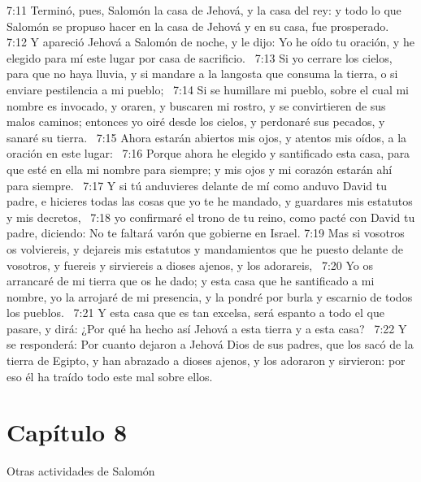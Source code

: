 							7:11 Terminó, pues, Salomón la casa de Jehová, y la casa del rey: y todo lo que Salomón se propuso hacer en la casa de Jehová y en su casa, fue prosperado.  
							7:12 Y apareció Jehová a Salomón de noche, y le dijo: Yo he oído tu oración, y he elegido para mí este lugar por casa de sacrificio.  
							7:13 Si yo cerrare los cielos, para que no haya lluvia, y si mandare a la langosta que consuma la tierra, o si enviare pestilencia a mi pueblo;  
							7:14 Si se humillare mi pueblo, sobre el cual mi nombre es invocado, y oraren, y buscaren mi rostro, y se convirtieren de sus malos caminos; entonces yo oiré desde los cielos, y perdonaré sus pecados, y sanaré su tierra.  
							7:15 Ahora estarán abiertos mis ojos, y atentos mis oídos, a la oración en este lugar:  
							7:16 Porque ahora he elegido y santificado esta casa, para que esté en ella mi nombre para siempre; y mis ojos y mi corazón estarán ahí para siempre.  
							7:17 Y si tú anduvieres delante de mí como anduvo David tu padre, e hicieres todas las cosas que yo te he mandado, y guardares mis estatutos y mis decretos,  
							7:18 yo confirmaré el trono de tu reino, como pacté con David tu padre, diciendo: No te faltará varón que gobierne en Israel. 
							7:19 Mas si vosotros os volviereis, y dejareis mis estatutos y mandamientos que he puesto delante de vosotros, y fuereis y sirviereis a dioses ajenos, y los adorareis,  
							7:20 Yo os arrancaré de mi tierra que os he dado; y esta casa que he santificado a mi nombre, yo la arrojaré de mi presencia, y la pondré por burla y escarnio de todos los pueblos.  
							7:21 Y esta casa que es tan excelsa, será espanto a todo el que pasare, y dirá: ¿Por qué ha hecho así Jehová a esta tierra y a esta casa?  
							7:22 Y se responderá: Por cuanto dejaron a Jehová Dios de sus padres, que los sacó de la tierra de Egipto, y han abrazado a dioses ajenos, y los adoraron y sirvieron: por eso él ha traído todo este mal sobre ellos.  
							\section*{Capítulo 8 }
								Otras actividades de Salomón  
								
